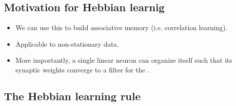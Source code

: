 \newpage

\subsection{Motivation for Hebbian learnig}

\begin{frame}{\subsecname}

\begin{itemize}
\item We can use this to build associative memory (i.e. correlation learning).
\item Applicable to non-stationary data.
\item More importantly, a single linear neuron 
can organize itself such that its synaptic weights converge to a filter 
for the  \citep{oja1982simplified}.

\pause


\end{itemize}

\end{frame}

\subsection{The Hebbian learning rule}


